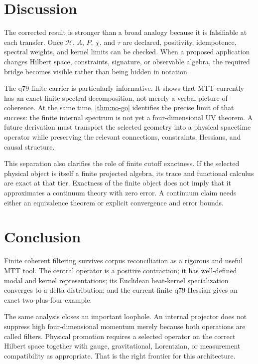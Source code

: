 \documentclass[11pt]{article}
\theoremstyle{definition}
\theoremstyle{remark}
\newcommand{\Hspace}{\mathcal H}
\begin{document}
\section{Discussion}

The corrected result is stronger than a broad analogy because it is
falsifiable at each transfer. Once \(\Hspace\), \(A\), \(P\), \(\chi\), and
\(\tau\) are declared, positivity, idempotence, spectral weights, and kernel
limits can be checked. When a proposed application changes Hilbert space,
constraints, signature, or observable algebra, the required bridge becomes
visible rather than being hidden in notation.

The q79 finite carrier is particularly informative. It shows that MTT
currently has an exact finite spectral decomposition, not merely a verbal
picture of coherence. At the same time, \autoref{thm:no-go} identifies the
precise limit of that success: the finite internal spectrum is not yet a
four-dimensional UV theorem. A future derivation must transport the selected
geometry into a physical spacetime operator while preserving the relevant
connections, constraints, Hessians, and causal structure.

This separation also clarifies the role of finite cutoff exactness. If the
selected physical object is itself a finite projected algebra, its trace and
functional calculus are exact at that tier. Exactness of the finite object
does not imply that it approximates a continuum theory with zero error. A
continuum claim needs either an equivalence theorem or explicit convergence
and error bounds.

\section{Conclusion}

Finite coherent filtering survives corpus reconciliation as a rigorous and
useful MTT tool. The central operator is a positive contraction; it has
well-defined modal and kernel representations; its Euclidean heat-kernel
specialization converges to a delta distribution; and the current finite q79
Hessian gives an exact two-plus-four example.

The same analysis closes an important loophole. An internal projector does
not suppress high four-dimensional momentum merely because both operations
are called filters. Physical promotion requires a selected operator on the
correct Hilbert space together with gauge, gravitational, Lorentzian, or
measurement compatibility as appropriate. That is the right frontier for
this architecture.
\end{document}
